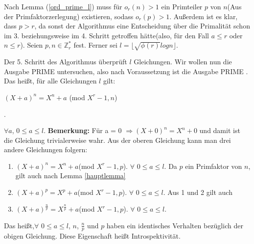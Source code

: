 \documentclass[12pt,oneside]{article}
\theoremstyle{remark}
\theoremstyle{definition}
\begin{document}
Nach Lemma (\ref{ord_prime_l}) muss für  $o_{r}(n) > 1$ ein Primteiler $p$ von $n$(Aus der Primfaktorzerlegung) existieren, sodass $o_{r}(p) > 1$. Außerdem ist es klar, dass $p > r$, da sonst der Algorithmus eine Entscheidung über die Primalität schon im 3. beziehungsweise im 4. Schritt getroffen hätte(also, für den Fall $a \leq r$ oder $n \leq r$). Seien $p,n \in \mathbb{Z}_{r}^{*}$ fest. Ferner sei  $l = \lfloor \sqrt{\phi(r)} log n \rfloor$.\newline\newline

Der 5. Schritt des Algorithmus überprüft $l$ Gleichungen. Wir wollen nun die Ausgabe PRIME untersuchen, also nach Voraussetzung ist die Ausgabe PRIME . Das heißt, für alle Gleichungen $l$ gilt:\newline\newline
\centerline{$(X + a)^n = X^n + a $ (mod $X^r - 1, n$)}.

$\forall a$, $ 0 \leq a \leq l$.\newline\newline
\textbf{Bemerkung:} Für a = 0 $\Rightarrow (X + 0)^n = X^n + 0$ und damit ist die Gleichung trivialerweise wahr.\newline\newline 
Aus der oberen Gleichung kann man drei andere Gleichungen folgern:
\begin{enumerate}
    \item $(X + a)^n = X^n + a $(mod $X^r - 1, p$).
$\forall$ $ 0 \leq a \leq l$.\newline\newline  
Da $p$ ein Primfaktor von $n$, gilt auch nach Lemma \ref{hauptlemma} \newline
\item $(X + a)^p = X^p + a $(mod $X^r - 1, p$).
$\forall$ $0 \leq a \leq l$.\newline\newline
Aus 1 und 2 gilt auch\newline
\item $(X + a)^{\frac{n}{p}} = X^{\frac{n}{p}} + a $(mod $X^r - 1, p$).
$\forall$ $0 \leq a \leq l$.\newline\newline
\end{enumerate}

Das heißt,$\forall$ $0 \leq a \leq l$, $n$, $\frac{n}{p}$ und $p$ haben ein identisches Verhalten bezüglich der obigen Gleichung. Diese Eigenschaft heißt Introspektivität.\newline    
\end{document}

